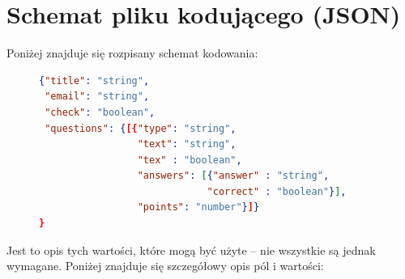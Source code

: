 \section{Schemat pliku kodującego (JSON)}
Poniżej znajduje się rozpisany schemat kodowania: 
\begin{figure}[H]
\begin{lstlisting}[language=json,firstnumber=1]
{"title": "string",
 "email": "string",
 "check": "boolean",
 "questions": {[{"type": "string", 
                 "text": "string",
                 "tex" : "boolean",
                 "answers": [{"answer" : "string",
                             "correct" : "boolean"}],
                 "points": "number"}]}
}

\end{lstlisting}
\end{figure}
Jest to opis tych wartości, które mogą być użyte -- nie wszystkie są jednak  wymagane. Poniżej znajduje się szczegółowy opis pól i wartości:
